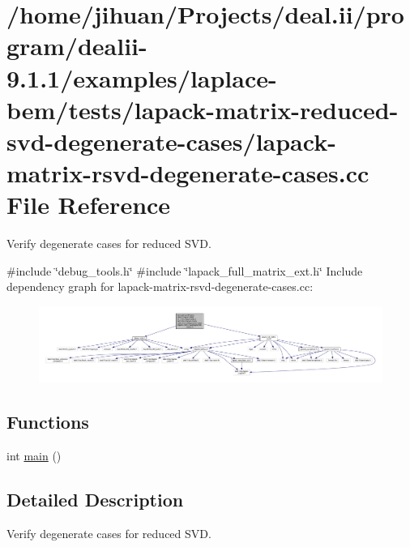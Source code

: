 \hypertarget{lapack-matrix-rsvd-degenerate-cases_8cc}{}\section{/home/jihuan/\+Projects/deal.ii/program/dealii-\/9.1.1/examples/laplace-\/bem/tests/lapack-\/matrix-\/reduced-\/svd-\/degenerate-\/cases/lapack-\/matrix-\/rsvd-\/degenerate-\/cases.cc File Reference}
\label{lapack-matrix-rsvd-degenerate-cases_8cc}


Verify degenerate cases for reduced S\+VD.  


{\ttfamily \#include \char`\"{}debug\+\_\+tools.\+h\char`\"{}}\newline
{\ttfamily \#include \char`\"{}lapack\+\_\+full\+\_\+matrix\+\_\+ext.\+h\char`\"{}}\newline
Include dependency graph for lapack-\/matrix-\/rsvd-\/degenerate-\/cases.cc\+:
\nopagebreak
\begin{figure}[H]
\begin{center}
\leavevmode
\includegraphics[width=350pt]{lapack-matrix-rsvd-degenerate-cases_8cc__incl}
\end{center}
\end{figure}
\subsection*{Functions}
\begin{DoxyCompactItemize}
\item 
int \hyperlink{lapack-matrix-rsvd-degenerate-cases_8cc_ae66f6b31b5ad750f1fe042a706a4e3d4}{main} ()
\end{DoxyCompactItemize}


\subsection{Detailed Description}
Verify degenerate cases for reduced S\+VD. 

